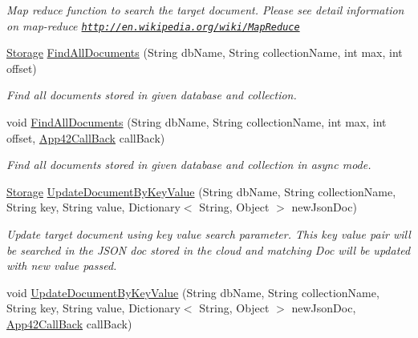 \begin{DoxyCompactItemize}
\begin{DoxyCompactList}\small\item\em Map reduce function to search the target document. Please see detail information on map-\/reduce \href{http://en.wikipedia.org/wiki/MapReduce}{\tt http\+://en.\+wikipedia.\+org/wiki/\+Map\+Reduce} \end{DoxyCompactList}\item 
\hyperlink{classcom_1_1shephertz_1_1app42_1_1paas_1_1sdk_1_1csharp_1_1storage_1_1_storage}{Storage} \hyperlink{classcom_1_1shephertz_1_1app42_1_1paas_1_1sdk_1_1csharp_1_1storage_1_1_storage_service_a5491c7e616793b443574689b0a7393b1}{Find\+All\+Documents} (String db\+Name, String collection\+Name, int max, int offset)
\begin{DoxyCompactList}\small\item\em Find all documents stored in given database and collection. \end{DoxyCompactList}\item 
void \hyperlink{classcom_1_1shephertz_1_1app42_1_1paas_1_1sdk_1_1csharp_1_1storage_1_1_storage_service_a1ac8b37b2cde5cc32adac2920a123a75}{Find\+All\+Documents} (String db\+Name, String collection\+Name, int max, int offset, \hyperlink{interfacecom_1_1shephertz_1_1app42_1_1paas_1_1sdk_1_1csharp_1_1_app42_call_back}{App42\+Call\+Back} call\+Back)
\begin{DoxyCompactList}\small\item\em Find all documents stored in given database and collection in async mode. \end{DoxyCompactList}\item 
\hyperlink{classcom_1_1shephertz_1_1app42_1_1paas_1_1sdk_1_1csharp_1_1storage_1_1_storage}{Storage} \hyperlink{classcom_1_1shephertz_1_1app42_1_1paas_1_1sdk_1_1csharp_1_1storage_1_1_storage_service_ab797e20bd1e3db8a7042eac45fcc1afe}{Update\+Document\+By\+Key\+Value} (String db\+Name, String collection\+Name, String key, String value, Dictionary$<$ String, Object $>$ new\+Json\+Doc)
\begin{DoxyCompactList}\small\item\em Update target document using key value search parameter. This key value pair will be searched in the J\+S\+O\+N doc stored in the cloud and matching Doc will be updated with new value passed. \end{DoxyCompactList}\item 
void \hyperlink{classcom_1_1shephertz_1_1app42_1_1paas_1_1sdk_1_1csharp_1_1storage_1_1_storage_service_a6e1e868fb11a2bd20c6008c60326e29a}{Update\+Document\+By\+Key\+Value} (String db\+Name, String collection\+Name, String key, String value, Dictionary$<$ String, Object $>$ new\+Json\+Doc, \hyperlink{interfacecom_1_1shephertz_1_1app42_1_1paas_1_1sdk_1_1csharp_1_1_app42_call_back}{App42\+Call\+Back} call\+Back)

\end{DoxyCompactItemize}
